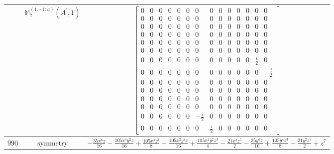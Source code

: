 \documentclass[fleqn,8pt,landscape]{jsarticle}
\begin{document}
\begin{longtable}{ccc}
$  $ & $ \mathbb{M}_{7}^{(1,-1;a)}(A^{\prime},1) $ & $ \begin{bmatrix} 0 & 0 & 0 & 0 & 0 & 0 & 0 & 0 & 0 & 0 & 0 & 0 & 0 & 0 \\ 0 & 0 & 0 & 0 & 0 & 0 & 0 & 0 & 0 & 0 & 0 & 0 & 0 & 0 \\ 0 & 0 & 0 & 0 & 0 & 0 & 0 & 0 & 0 & 0 & 0 & 0 & 0 & 0 \\ 0 & 0 & 0 & 0 & 0 & 0 & 0 & 0 & 0 & 0 & 0 & 0 & 0 & 0 \\ 0 & 0 & 0 & 0 & 0 & 0 & 0 & 0 & 0 & 0 & 0 & 0 & 0 & 0 \\ 0 & 0 & 0 & 0 & 0 & 0 & 0 & 0 & 0 & 0 & 0 & 0 & 0 & 0 \\ 0 & 0 & 0 & 0 & 0 & 0 & 0 & 0 & 0 & 0 & 0 & 0 & \frac{i}{2} & 0 \\ 0 & 0 & 0 & 0 & 0 & 0 & 0 & 0 & 0 & 0 & 0 & 0 & 0 & - \frac{i}{2} \\ 0 & 0 & 0 & 0 & 0 & 0 & 0 & 0 & 0 & 0 & 0 & 0 & 0 & 0 \\ 0 & 0 & 0 & 0 & 0 & 0 & 0 & 0 & 0 & 0 & 0 & 0 & 0 & 0 \\ 0 & 0 & 0 & 0 & 0 & 0 & 0 & 0 & 0 & 0 & 0 & 0 & 0 & 0 \\ 0 & 0 & 0 & 0 & 0 & 0 & 0 & 0 & 0 & 0 & 0 & 0 & 0 & 0 \\ 0 & 0 & 0 & 0 & 0 & 0 & - \frac{i}{2} & 0 & 0 & 0 & 0 & 0 & 0 & 0 \\ 0 & 0 & 0 & 0 & 0 & 0 & 0 & \frac{i}{2} & 0 & 0 & 0 & 0 & 0 & 0 \end{bmatrix} $ \\ \hline
$ 990 $ & $ \text{symmetry} $ & $ - \frac{35 x^{6} z}{16} - \frac{105 x^{4} y^{2} z}{16} + \frac{105 x^{4} z^{3}}{8} - \frac{105 x^{2} y^{4} z}{16} + \frac{105 x^{2} y^{2} z^{3}}{4} - \frac{21 x^{2} z^{5}}{2} - \frac{35 y^{6} z}{16} + \frac{105 y^{4} z^{3}}{8} - \frac{21 y^{2} z^{5}}{2} + z^{7} $ \\

\end{longtable}
\end{document}
